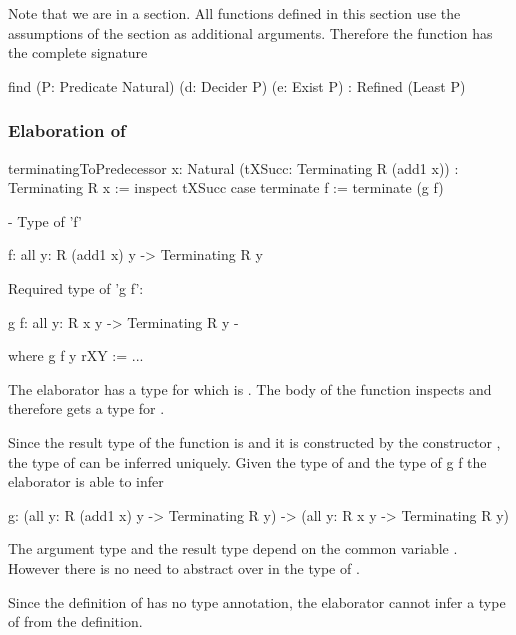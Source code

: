 Note that we are in a section. All functions defined in this section use the
assumptions of the section as additional arguments. Therefore the function
 has the complete signature
%
\begin{alba}
    find
        (P: Predicate Natural) (d: Decider P) (e: Exist P)
        : Refined (Least P)
\end{alba}







\subsubsection{Elaboration of }



\begin{alba}
    terminatingToPredecessor
        {x: Natural}
        (tXSucc: Terminating R (add1 x))
        : Terminating R x
    :=
        inspect tXSucc case
            terminate f :=
                terminate (g f)
            {- Type of 'f'

                f: all {y}: R (add1 x) y -> Terminating R y

               Required type of 'g f':

                g f: all {y}: R x y -> Terminating R y
            -}
        where
            g f {y} rXY :=
                ...
\end{alba}


The elaborator has a type for  which is
%
.
%
The body of the function inspects  and therefore gets a type for
.

Since the result type of the function is  and it is
constructed by the constructor , the type of  can be
inferred uniquely. Given the type of  and the type of {g f} the
elaborator is able to infer
%
\begin{alba}
    g:  (all {y}: R (add1 x) y -> Terminating R y)
        ->
        (all {y}: R x y -> Terminating R y)
\end{alba}
%
The argument type and the result type depend on the common variable .
However there is no need to abstract over  in the type of .

Since the definition of  has no type annotation, the elaborator cannot
infer a type of  from the definition.


